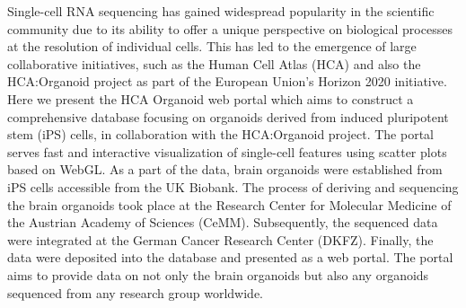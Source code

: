 \noindent
Single-cell RNA sequencing has gained widespread popularity in the scientific community due to its ability to offer a unique perspective on biological processes at the resolution of individual cells. This has led to the emergence of large collaborative initiatives, such as the Human Cell Atlas (HCA) and also the HCA:Organoid project as part of the European Union's Horizon 2020 initiative. Here we present the HCA Organoid web portal which aims to construct a comprehensive database focusing on organoids derived from induced pluripotent stem (iPS) cells, in collaboration with the HCA:Organoid project. The portal serves fast and interactive visualization of single-cell features using scatter plots based on WebGL. As a part of the data, brain organoids were established from iPS cells accessible from the UK Biobank. The process of deriving and sequencing the brain organoids took place at the Research Center for Molecular Medicine of the Austrian Academy of Sciences (CeMM). Subsequently, the sequenced data were integrated at the German Cancer Research Center (DKFZ). Finally, the data were deposited into the database and presented as a web portal. The portal aims to provide data on not only the brain organoids but also any organoids sequenced from any research group worldwide.
\newpage
